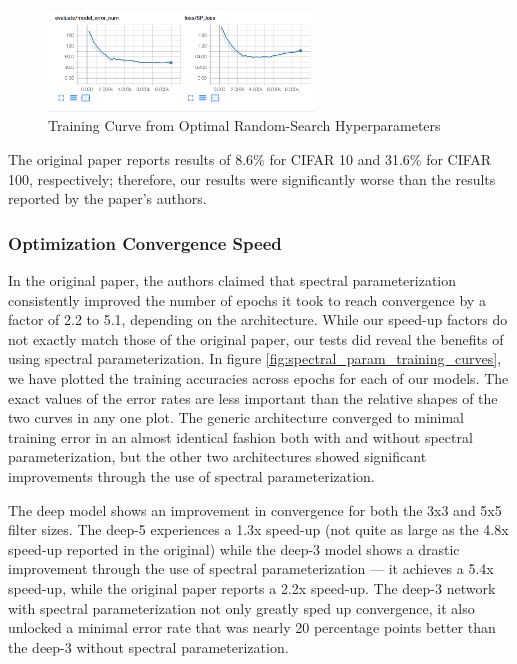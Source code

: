 \documentclass[10pt,journal,compsoc]{IEEEtran}
\begin{document}
\begin{figure}
\centering
  \includegraphics[width=200pt]{images/Training_Curve_10.png}
  \caption{Training Curve from Optimal Random-Search Hyperparameters}
  \label{fig:train_curve}
\end{figure}

The original paper reports results of 8.6\% for CIFAR 10 and 31.6\% for CIFAR 100, respectively; therefore, our results were significantly worse than the results reported by the paper's authors.

\subsubsection{Optimization Convergence Speed}\label{ssec:spec_conv_results}

In the original paper, the authors claimed that spectral parameterization consistently improved the number of epochs it took to reach convergence by a factor of 2.2 to 5.1, depending on the architecture. While our speed-up factors do not exactly match those of the original paper, our tests did reveal the benefits of using spectral parameterization. In figure \ref{fig:spectral_param_training_curves}, we have plotted the training accuracies across epochs for each of our models. The exact values of the error rates are less important than the relative shapes of the two curves in any one plot. The generic architecture converged to minimal training error in an almost identical fashion both with and without spectral parameterization, but the other two architectures showed significant improvements through the use of spectral parameterization.

The deep model shows an improvement in convergence for both the 3x3 and 5x5 filter sizes. The deep-5 experiences a 1.3x speed-up (not quite as large as the 4.8x speed-up reported in the original) while the deep-3 model shows a drastic improvement through the use of spectral parameterization — it achieves a 5.4x speed-up, while the original paper reports a 2.2x speed-up. The deep-3 network with spectral parameterization not only greatly sped up convergence, it also unlocked a minimal error rate that was nearly 20 percentage points better than the deep-3 without spectral parameterization.
\end{document}
